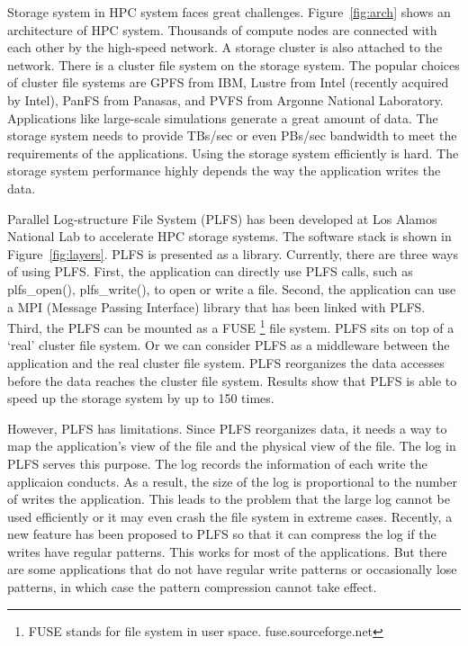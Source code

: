 \documentclass{acm_proc_article-sp}
\begin{document}
Storage system in HPC system faces great challenges.
Figure~\ref{fig:arch} shows an architecture of
HPC system. Thousands of compute nodes are connected
with each other by the high-speed network. A storage
cluster is also attached to the network. There is
a cluster file system on the storage system. The popular
choices of cluster file systems are GPFS from IBM,
Lustre from Intel (recently acquired by Intel),
PanFS from Panasas, and PVFS from Argonne 
National Laboratory. Applications like large-scale
simulations generate a great amount of data. The storage
system needs to provide TBs/sec or even PBs/sec
bandwidth to meet the requirements of the applications.
Using the storage system efficiently is hard. The
storage system performance highly depends the way the
application writes the data.

Parallel Log-structure File System (PLFS) \cite{bent2009plfs}
has been developed
at Los Alamos National Lab to accelerate HPC storage
systems. The software stack is shown in Figure~\ref{fig:layers}.
PLFS is presented as a library. Currently, there
are three ways of using PLFS. First, the application
can directly use PLFS calls, such as plfs\_open(),
plfs\_write(), to open or write a file. 
Second, the application can use a MPI (Message Passing
Interface) library that has been linked with PLFS. 
Third, the PLFS can be mounted as a FUSE 
\footnote{FUSE stands for file system in user space. fuse.sourceforge.net}
file system.
PLFS sits on top of a `real' cluster file system.
Or we can consider PLFS as a middleware between
the application and the real cluster file system.
PLFS reorganizes the data accesses before the
data reaches the cluster file system. 
Results show that PLFS is able to speed up
the storage system by up to 150 times. 

However, PLFS has limitations. Since PLFS reorganizes
data, it needs a way to map the application's view
of the file and the physical view of the file. 
The log in PLFS serves this purpose. The log
records the information of each write the applicaion
conducts. As a result, the size of the log
is proportional to the number of writes the
application. This leads to the problem
that the large log cannot be used efficiently
or it may even crash the file system in extreme
cases. Recently, a new feature has been proposed
to PLFS so that it can compress the log if the 
writes have regular patterns\cite{HeBTGGMS13}. This works
for most of the applications. But there are
some applications that do not have regular 
write patterns or occasionally lose patterns,
in which case the pattern compression cannot
take effect. 
\end{document}
